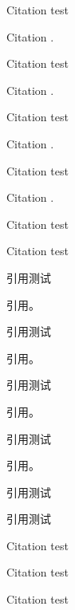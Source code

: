 \documentclass[UTF8,scheme=plain,fontset=fandol]{ctexart}
\begin{document}
\START
\showoutput

Citation \citet{jon88} test\par
Citation \citet{jon88}.\par
Citation \citet[42]{jon89} test\par
Citation \citet[42]{jon89}.\par
Citation \citep{jon88} test\par
Citation \citep{jon88}.\par
Citation \citep[42]{jon89} test\par
Citation \citep[42]{jon89}.\par
Citation \citep[see][]{jon90} test\par
Citation \citep[see][42]{jon90} test\par

引用\citet{lzp1}测试\par
引用\citet{lzp1}。\par
引用\citet[42]{lzp2}测试\par
引用\citet[42]{lzp2}。\par
引用\citep{lzp1}测试\par
引用\citep{lzp1}。\par
引用\citep[42]{lzp2}测试\par
引用\citep[42]{lzp2}。\par
引用\citep[见][]{lzp3}测试\par
引用\citep[见][42]{lzp3}测试\par

Citation \citep{jon88} test\par
Citation \citep{jon89,jon90} test\par
Citation \citep{lzp1,lzp2,lzp3} test\par

\clearpage
\OMIT


\end{document}
